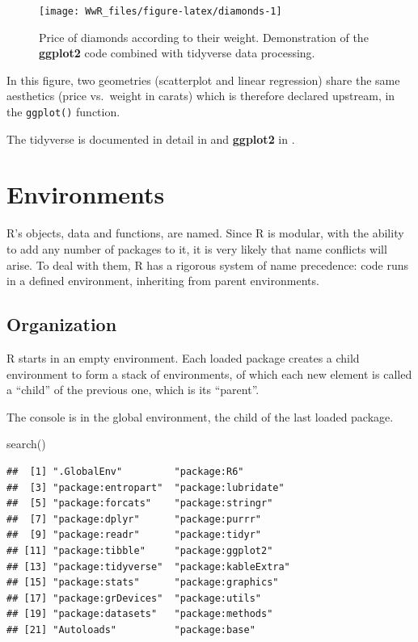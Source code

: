\documentclass[
  12pt,
  american,
  a4paper,
  extrafontsizes,onecolumn,openright
  ]{memoir}
\newenvironment{Shaded}{\begin{snugshade}}{\end{snugshade}}
\newcommand{\FunctionTok}[1]{\textcolor[rgb]{0.00,0.00,0.00}{#1}}
\newcommand{\NormalTok}[1]{#1}
\begin{document}
\begin{figure}

{\centering \texttt{[image: WwR\_files/figure-latex/diamonds-1]} 

}

\caption{Price of diamonds according to their weight. Demonstration of the \textbf{ggplot2} code combined with tidyverse data processing.}\label{fig:diamonds}
\end{figure}

\normalsize

In this figure, two geometries (scatterplot and linear regression) share the same aesthetics (price vs.~weight in carats) which is therefore declared upstream, in the \texttt{ggplot()} function.

The tidyverse is documented in detail in \textcite{Wickham2016} and \textbf{ggplot2} in \textcite{Wickham2017}.

\hypertarget{sec:environnements}{%
\section{Environments}\label{sec:environnements}}

R's objects, data and functions, are named.
Since R is modular, with the ability to add any number of packages to it, it is very likely that name conflicts will arise.
To deal with them, R has a rigorous system of name precedence: code runs in a defined environment, inheriting from parent environments.

\hypertarget{organization}{%
\subsection{Organization}\label{organization}}

R starts in an empty environment.
Each loaded package creates a child environment to form a stack of environments, of which each new element is called a \enquote{child} of the previous one, which is its \enquote{parent}.

The console is in the global environment, the child of the last loaded package.

\scriptsize

\begin{Shaded}
\begin{Highlighting}[]
\FunctionTok{search}\NormalTok{()}
\end{Highlighting}
\end{Shaded}

\begin{verbatim}
##  [1] ".GlobalEnv"         "package:R6"        
##  [3] "package:entropart"  "package:lubridate" 
##  [5] "package:forcats"    "package:stringr"   
##  [7] "package:dplyr"      "package:purrr"     
##  [9] "package:readr"      "package:tidyr"     
## [11] "package:tibble"     "package:ggplot2"   
## [13] "package:tidyverse"  "package:kableExtra"
## [15] "package:stats"      "package:graphics"  
## [17] "package:grDevices"  "package:utils"     
## [19] "package:datasets"   "package:methods"   
## [21] "Autoloads"          "package:base"
\end{verbatim}
\end{document}
